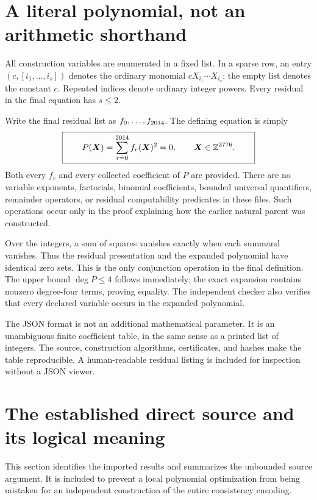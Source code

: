 \documentclass[11pt,letterpaper]{article}
\theoremstyle{definition}
\newcommand{\Z}{\mathbb Z}
\begin{document}
\section{A literal polynomial, not an arithmetic shorthand}
\label{sec:literal}

All construction variables are enumerated in a fixed list. In a sparse
row, an entry $(c,[i_1,\ldots,i_s])$ denotes the ordinary monomial
$cX_{i_1}\cdots X_{i_s}$; the empty list denotes the constant $c$.
Repeated indices denote ordinary integer powers. Every residual in the
final equation has $s\le2$.

Write the final residual list as $f_0,\ldots,f_{2014}$. The defining
equation is simply
\begin{equation}
\label{eq:definition}
\boxed{\qquad P(\boldsymbol X)
=\sum_{r=0}^{\MainLastRow} f_r(\boldsymbol X)^2=0,
\qquad\boldsymbol X\in\Z^{\MainVars}.\qquad}
\end{equation}
Both every $f_r$ and every collected coefficient of $P$ are provided.
There are no variable exponents, factorials, binomial coefficients,
bounded universal quantifiers, remainder operators, or residual
computability predicates in these files. Such operations occur only in
the proof explaining how the earlier natural parent was constructed.

Over the integers, a sum of squares vanishes exactly when each summand
vanishes. Thus the residual presentation and the expanded polynomial
have identical zero sets. This is the only conjunction operation in the
final definition. The upper bound $\deg P\le4$ follows immediately;
the exact expansion contains nonzero degree-four terms, proving equality.
The independent checker also verifies that every declared variable
occurs in the expanded polynomial.

The JSON format is not an additional mathematical parameter. It is an
unambiguous finite coefficient table, in the same sense as a printed
list of integers. The source, construction algorithms, certificates,
and hashes make the table reproducible. A human-readable residual
listing is included for inspection without a JSON viewer.

\section{The established direct source and its logical meaning}
\label{sec:source}

This section identifies the imported results and summarizes the
unbounded source argument. It is included to prevent a local polynomial
optimization from being mistaken for an independent construction of the
entire consistency encoding.
\end{document}
